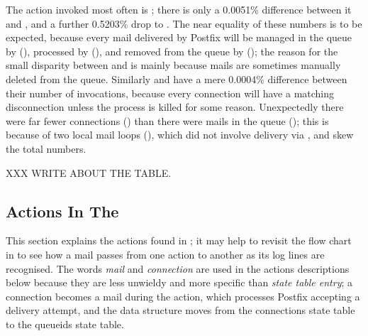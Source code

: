 The action invoked most often is ; there is only a
0.0051\% difference between it and , and a
further 0.5203\% drop to .  The near equality of these
numbers is to be expected, because every mail delivered by Postfix will be
managed in the queue by  (), processed by
 (), and removed from the queue
by  (); the reason for the small disparity
between  and  is mainly because mails
are sometimes manually deleted from the queue.  Similarly 
and  have a mere 0.0004\% difference between their
number of invocations, because every connection will have a matching
disconnection unless the  process is killed for some reason.
Unexpectedly there were far fewer connections () than there
were mails in the queue (); this is because of two
local mail loops (),
which did not involve delivery via , and skew the total
numbers.

XXX WRITE ABOUT THE TABLE\@.



\newlength{\tabcolsepORIG}
\setlength{\tabcolsepORIG}{\tabcolsep}
\addtolength{\tabcolsep}{-1pt}


\setlength{\tabcolsep}{\tabcolsepORIG}

\subsection{Actions In The \parsernamelong{}}

\label{actions in detail in implementation}

This section explains the actions found in \parsername{}; it may help to
revisit the flow chart in  to see how a mail passes
from one action to another as its log lines are recognised.  The words
\textit{mail\/} and \textit{connection\/} are used in the actions
descriptions below because they are less unwieldy and more specific than
\textit{state table entry\/}; a connection becomes a mail during the
 action, which processes Postfix accepting a delivery
attempt, and the data structure moves from the connections state table to
the queueids state table.


